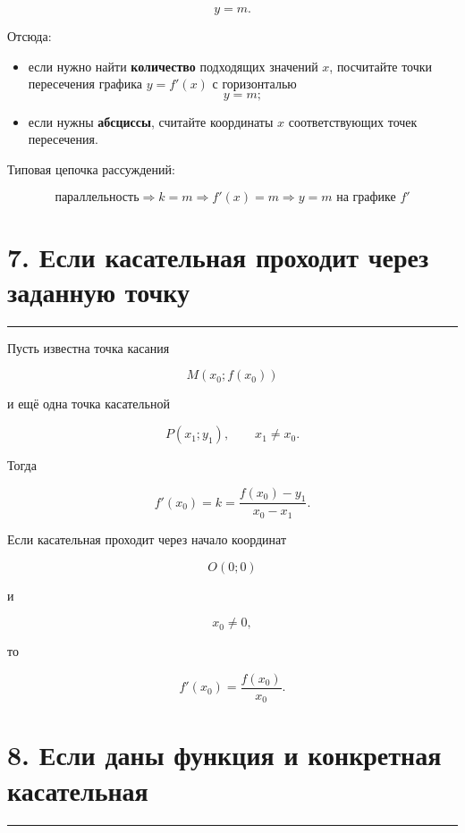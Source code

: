 \documentclass[a4paper,12pt]{article}
\newcommand{\checkbox}{\(\square\)}
\newcommand{\topicrule}{%
  \par\noindent
  {\color{accent}\rule{\linewidth}{0.55pt}}
  \par
}
\begin{document}
\[
y=m.
\]

Отсюда:

\begin{itemize}
  \item[\checkbox]
  если нужно найти \textbf{количество} подходящих значений \(x\),
  посчитайте точки пересечения графика \(y=f'(x)\) с горизонталью
  \[
  y=m;
  \]

  \item[\checkbox]
  если нужны \textbf{абсциссы}, считайте координаты \(x\)
  соответствующих точек пересечения.
\end{itemize}

Типовая цепочка рассуждений:

\[
\boxed{
\text{параллельность}
\Rightarrow
k=m
\Rightarrow
f'(x)=m
\Rightarrow
y=m
\text{ на графике }f'
}
\]


\section*{\color{darkaccent}7. Если касательная проходит через заданную точку}
\topicrule

Пусть известна точка касания

\[
M(x_0;f(x_0))
\]

и ещё одна точка касательной

\[
P(x_1;y_1),
\qquad
x_1\ne x_0.
\]

Тогда

\[
\boxed{
f'(x_0)
=
k
=
\frac{f(x_0)-y_1}{x_0-x_1}
}.
\]

Если касательная проходит через начало координат

\[
O(0;0)
\]

и

\[
x_0\ne0,
\]

то

\[
\boxed{
f'(x_0)
=
\frac{f(x_0)}{x_0}
}.
\]


\section*{\color{darkaccent}8. Если даны функция и конкретная касательная}
\topicrule
\end{document}
